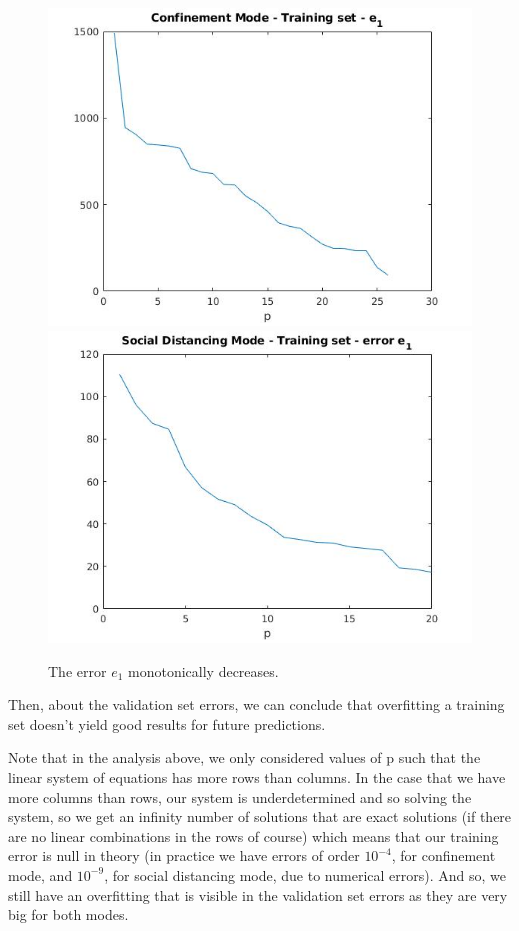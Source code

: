 \documentclass[11pt]{article}
\begin{document}
\begin{figure}[h!]
\centering
\includegraphics[scale=0.43]{Conf_train_e1.jpg}
\includegraphics[scale=0.43]{SD_train_e1.jpg}
\caption{The error $e_1$ monotonically decreases.}
\label{fig:e1}
\end{figure}

Then, about the validation set errors, we can conclude that overfitting a training set doesn't yield good results for future predictions.

Note that in the analysis above, we only considered values of p such that the linear system of equations has more rows than columns. 
In the case that we have more columns than rows, our system is underdetermined and so solving the system, so we get an infinity number of solutions that are exact solutions (if there are no linear combinations in the rows of course) which means that our training error is null in theory (in practice we have errors of order $10^{-4}$, for confinement mode, and $10^{-9}$, for social distancing mode, due to numerical errors). And so, we still have an overfitting that is visible in the validation set errors as they are very big for both modes.
\end{document}

